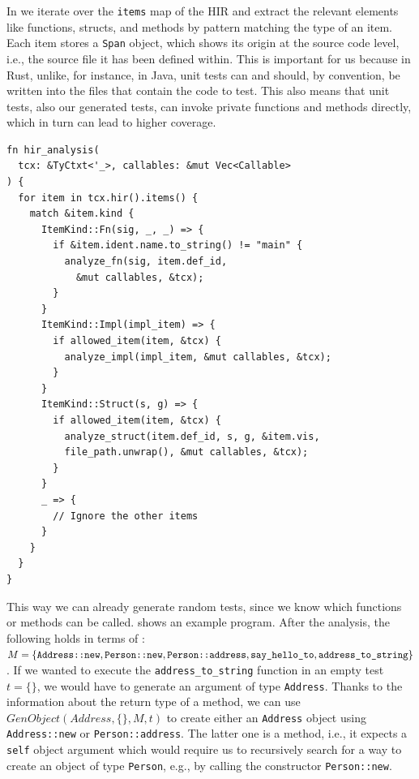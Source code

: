 \documentclass[paper=a4,%
  twoside,%
  BCOR4mm,%
  abstract=true,%
  toc=bibliography,%
  chapterprefix=true,%
  toc=bibliographynumbered,%
  open=right,%
  english,%
  pagesize=pdftex]{scrreprt}
\newcommand{\hir}{\ac{HIR}\xspace}
\begin{document}
In  we iterate over the \texttt{items} map of the \hir and extract the relevant elements like functions, structs, and methods by pattern matching the type of an item. Each item stores a \texttt{Span} object, which shows its origin at the source code level, i.e., the source file it has been defined within. This is important for us because in Rust, unlike, for instance, in Java, unit tests can and should, by convention, be written into the files that contain the code to test. This also means that unit tests, also our generated tests, can invoke private functions and methods directly, which in turn can lead to higher coverage.

\begin{lstlisting}[style=boxed, caption={Iterate over the items in the HIR of a crate}, label=lst:hir-analysis]
fn hir_analysis(
  tcx: &TyCtxt<'_>, callables: &mut Vec<Callable>
) {
  for item in tcx.hir().items() {
    match &item.kind {
      ItemKind::Fn(sig, _, _) => {
        if &item.ident.name.to_string() != "main" {
          analyze_fn(sig, item.def_id,
            &mut callables, &tcx);
        }
      }
      ItemKind::Impl(impl_item) => {
        if allowed_item(item, &tcx) {
          analyze_impl(impl_item, &mut callables, &tcx);
        }
      }
      ItemKind::Struct(s, g) => {
        if allowed_item(item, &tcx) {
          analyze_struct(item.def_id, s, g, &item.vis,
          file_path.unwrap(), &mut callables, &tcx);
        }
      }
      _ => {
        // Ignore the other items
      }
    }
  }
}
\end{lstlisting}

This way we can already generate random tests, since we know which functions or methods can be called.  shows an example program. After the analysis, the following holds in terms of : $M = \{\texttt{Address::new}, \texttt{Person::new}, \texttt{Person::address}, \texttt{say\string_hello\string_to}, \texttt{address\string_to\string_string}\}$. If we wanted to execute the \texttt{address\string_to\string_string} function in an empty test $t = \{\}$, we would have to generate an argument of type \texttt{Address}. Thanks to the information about the return type of a method, we can use $GenObject(Address, \{\}, M, t)$ to create either an \texttt{Address} object using \texttt{Address::new} or \texttt{Person::address}. The latter one is a method, i.e., it expects a \texttt{self} object argument which would require us to recursively search for a way to create an object of type \texttt{Person}, e.g., by calling the constructor \texttt{Person::new}.
\end{document}
